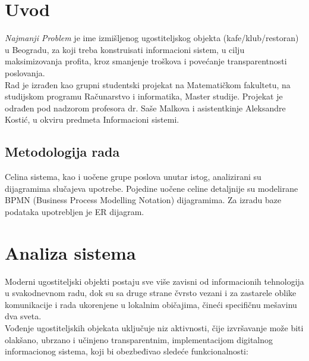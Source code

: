 \documentclass{article}
\begin{document}
\tableofcontents
\newpage


\section{Uvod}
\emph{Najmanji Problem} je ime izmišljenog ugostiteljskog objekta (kafe/klub/restoran) u Beogradu, za koji treba konstruisati informacioni sistem, u cilju maksimizovanja profita, kroz smanjenje troškova i povećanje transparentnosti
poslovanja.\\

Rad je izrađen kao grupni studentski projekat na Matematičkom fakultetu, na studijskom programu Računarstvo i informatika,  Master studije. Projekat je odrađen pod nadzorom profesora dr. Saše Malkova i asistentkinje Aleksandre Kostić, u okviru predmeta Informacioni sistemi.\\


\subsection{Metodologija rada}

Celina sistema, kao i uočene grupe poslova unutar istog, analizirani su dijagramima slučajeva upotrebe. Pojedine uočene celine detaljnije su modelirane BPMN (Business Process Modelling Notation) dijagramima. Za izradu baze podataka upotrebljen je ER dijagram.


\section{Analiza sistema}

Moderni ugostiteljski objekti postaju sve više zavisni od informacionih tehnologija u svakodnevnom radu, dok su sa druge strane čvrsto vezani i za zastarele oblike komunikacije i rada ukorenjene u lokalnim običajima, čineći specifičnu
mešavinu dva sveta.\\

Vođenje ugostiteljskih objekata uključuje niz aktivnosti, čije izvršavanje može biti olakšano, ubrzano i učinjeno transparentnim, implementacijom digitalnog informacionog sistema, koji bi obezbeđivao sledeće funkcionalnosti:\\
\end{document}

